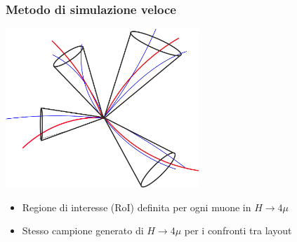 \documentclass{beamer}
\begin{document}
\begin{frame}[t]
\frametitle{Metodo di simulazione veloce}
\centering
\includegraphics[width=.6\textwidth, height=6cm]{cone_3}

\begin{itemize}
\item Regione di interesse (RoI) definita per ogni muone in $H \rightarrow 4\mu$
\item Stesso campione generato di $H \rightarrow 4\mu$ per i confronti tra layout
\end{itemize}

\end{frame}
\end{document}
